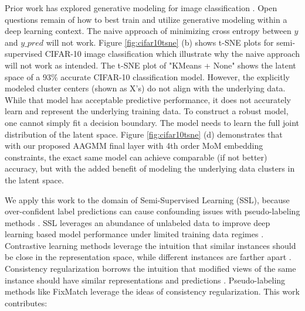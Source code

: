 \documentclass[10pt,twocolumn,letterpaper]{article}
\begin{document}
Prior work has explored generative modeling for image classification \cite{li2019disentangled,kingma2013auto,kingma2019introduction}.
Open questions remain of how to best train and utilize generative modeling within a deep learning context.
The naive approach of minimizing cross entropy between $y$ and $y\_pred$ will not work.
Figure \ref{fig:cifar10tsne} (b) shows t-SNE plots for semi-supervised CIFAR-10 \cite{cifar10} image classification which illustrate why the naive approach will not work as intended. 
The t-SNE\cite{tsne} plot of "KMeans + None" shows the latent space of a $93\%$ accurate CIFAR-10 classification model. 
However, the explicitly modeled cluster centers (shown as X's) do not align with the underlying data.
While that model has acceptable predictive performance, it does not accurately learn and represent the underlying training data.
To construct a robust model, one cannot simply fit a decision boundary.
The model needs to learn the full joint distribution of the latent space. 
Figure \ref{fig:cifar10tsne} (d) demonstrates that with our proposed AAGMM final layer with 4th order MoM embedding constraints, the exact same model can achieve comparable (if not better) accuracy, but with the added benefit of modeling the underlying data clusters in the latent space.


We apply this work to the domain of Semi-Supervised Learning (SSL), because over-confident label predictions can cause confounding issues with pseudo-labeling methods \cite{arazo2020pseudo}.
SSL leverages an abundance of unlabeled data to improve deep learning based model performance under limited training data regimes \cite{zhu2022introduction,li2019safe,hady2013semi}.
Contrastive learning methods leverage the intuition that similar instances should be close in the representation space, while different instances are farther apart \cite{yang2022class,li2021comatch}.
Consistency regularization borrows the intuition that modified views of the same instance should have similar representations and predictions \cite{sohn2020fixmatch,lee2022contrastive,zhang2021flexmatch,kim2022conmatch}.
Pseudo-labeling methods like FixMatch \cite{sohn2020fixmatch} leverage the ideas of consistency regularization.
This work contributes:
\end{document}
